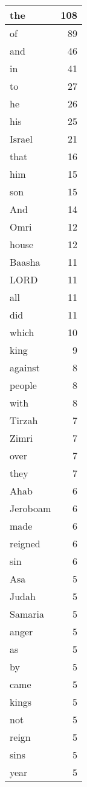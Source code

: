 \begin{center}
\begin{longtable}{l|r}
\hline \hline
\endlastfoot
the & 108 \\ \hline
of & 89 \\ \hline
and & 46 \\ \hline
in & 41 \\ \hline
to & 27 \\ \hline
he & 26 \\ \hline
his & 25 \\ \hline
Israel & 21 \\ \hline
that & 16 \\ \hline
him & 15 \\ \hline
son & 15 \\ \hline
And & 14 \\ \hline
Omri & 12 \\ \hline
house & 12 \\ \hline
Baasha & 11 \\ \hline
LORD & 11 \\ \hline
all & 11 \\ \hline
did & 11 \\ \hline
which & 10 \\ \hline
king & 9 \\ \hline
against & 8 \\ \hline
people & 8 \\ \hline
with & 8 \\ \hline
Tirzah & 7 \\ \hline
Zimri & 7 \\ \hline
over & 7 \\ \hline
they & 7 \\ \hline
Ahab & 6 \\ \hline
Jeroboam & 6 \\ \hline
made & 6 \\ \hline
reigned & 6 \\ \hline
sin & 6 \\ \hline
Asa & 5 \\ \hline
Judah & 5 \\ \hline
Samaria & 5 \\ \hline
anger & 5 \\ \hline
as & 5 \\ \hline
by & 5 \\ \hline
came & 5 \\ \hline
kings & 5 \\ \hline
not & 5 \\ \hline
reign & 5 \\ \hline
sins & 5 \\ \hline
year & 5 \\ \hline

\end{longtable}
\end{center}
